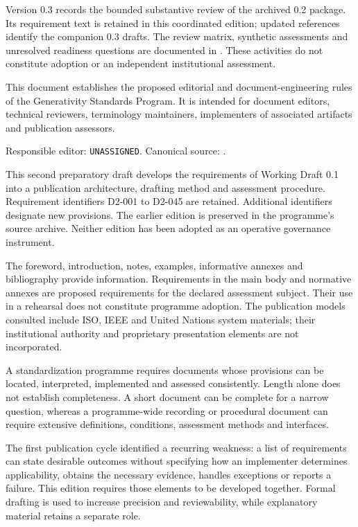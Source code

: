 \documentclass[11pt,a4paper]{article}
\begin{document}
\GSPfrontmatter
{}
Version 0.3 records the bounded substantive review of the archived 0.2 package. Its requirement text is retained in this coordinated edition; updated references identify the companion 0.3 drafts. The review matrix, synthetic assessments and unresolved readiness questions are documented in . These activities do not constitute adoption or an independent institutional assessment.

This document establishes the proposed editorial and document-engineering rules of the Generativity Standards Program. It is intended for document editors, technical reviewers, terminology maintainers, implementers of associated artifacts and publication assessors.

Responsible editor: \texttt{UNASSIGNED}. Canonical source: .

This second preparatory draft develops the requirements of Working Draft 0.1 into a publication architecture, drafting method and assessment procedure. Requirement identifiers D2-001 to D2-045 are retained. Additional identifiers designate new provisions. The earlier edition is preserved in the programme's source archive. Neither edition has been adopted as an operative governance instrument.

The foreword, introduction, notes, examples, informative annexes and bibliography provide information. Requirements in the main body and normative annexes are proposed requirements for the declared assessment subject. Their use in a rehearsal does not constitute programme adoption. The publication models consulted include ISO, IEEE and United Nations system materials; their institutional authority and proprietary presentation elements are not incorporated.

\tableofcontents
{}
A standardization programme requires documents whose provisions can be located, interpreted, implemented and assessed consistently. Length alone does not establish completeness. A short document can be complete for a narrow question, whereas a programme-wide recording or procedural document can require extensive definitions, conditions, assessment methods and interfaces.

The first publication cycle identified a recurring weakness: a list of requirements can state desirable outcomes without specifying how an implementer determines applicability, obtains the necessary evidence, handles exceptions or reports a failure. This edition requires those elements to be developed together. Formal drafting is used to increase precision and reviewability, while explanatory material retains a separate role.
\end{document}
